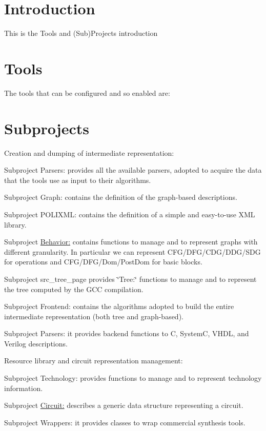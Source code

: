 \hypertarget{src_main_page_src_intro}{}\section{Introduction}\label{src_main_page_src_intro}
This is the Tools and (Sub)Projects introduction\hypertarget{src_main_page_src_tools}{}\section{Tools}\label{src_main_page_src_tools}
The tools that can be configured and so enabled are\+:\hypertarget{src_main_page_src_subprojects}{}\section{Subprojects}\label{src_main_page_src_subprojects}
Creation and dumping of intermediate representation\+:
\begin{DoxyItemize}
\item Subproject Parsers\+: provides all the available parsers, adopted to acquire the data that the tools use as input to their algorithms.
\item Subproject Graph\+: contains the definition of the graph-\/based descriptions.
\item Subproject P\+O\+L\+I\+X\+ML\+: contains the definition of a simple and easy-\/to-\/use X\+ML library.
\item Subproject \hyperlink{src_behavior_page}{Behavior\+:} contains functions to manage and to represent graphs with different granularity. In particular we can represent C\+F\+G/\+D\+F\+G/\+C\+D\+G/\+D\+D\+G/\+S\+DG for operations and C\+F\+G/\+D\+F\+G/\+Dom/\+Post\+Dom for basic blocks.
\item Subproject src\+\_\+tree\+\_\+page provides \char`\"{}\+Tree\+:\char`\"{} functions to manage and to represent the tree computed by the G\+CC compilation.
\item Subproject Frontend\+: contains the algorithms adopted to build the entire intermediate representation (both tree and graph-\/based).
\item Subproject Parsers\+: it provides backend functions to C, SystemC, V\+H\+DL, and Verilog descriptions.
\end{DoxyItemize}

Resource library and circuit representation management\+:
\begin{DoxyItemize}
\item Subproject Technology\+: provides functions to manage and to represent technology information.
\item Subproject \hyperlink{src_circuit_page}{Circuit\+:} describes a generic data structure representing a circuit.
\item Subproject Wrappers\+: it provides classes to wrap commercial synthesis tools.
\end{DoxyItemize}

